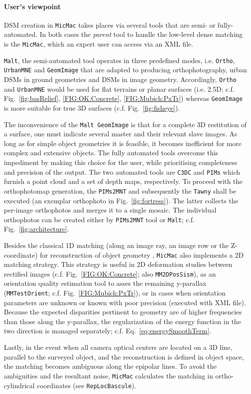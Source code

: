 \documentclass[twocolumn]{bmcart}%
\begin{document}
\paragraph*{User's viewpoint}
DSM creation in {\tt MicMac} takes places via several tools that are semi- or fully-automated. In both cases the \textit{parent} tool to handle the low-level dense matching is the {\tt MicMac}, which an expert user can access via an XML file.\par 
%
{\tt Malt}, the semi-automated tool operates in three predefined modes, i.e. {\tt Ortho}, {\tt UrbanMNE} and {\tt GeomImage} that are adapted to producing orthophotography, urban DSMs in ground geometries and DSMs in image geometry. Accordingly, {\tt Ortho} and {\tt UrbanMNE} would be used for flat terrains or planar surfaces (i.e. 2.5D; c.f. Fig.~\ref{fig:basRelief}, \ref{FIG:OK:Concrete}, \ref{FIG:Mubich:PxTr}) whereas {\tt GeomImage} is more suitable for true 3D surfaces (c.f. Fig.~\ref{fig:fisheye}).\par 
%
The inconvenience of the {\tt Malt GeomImage} is that for a complete 3D restitution of a surface, one must indicate several master and their relevant slave images. As long as for simple object geometries it is feasible, it becomes inefficient for more complex and extensive objects. The fully automated tools overcome this impediment by making this choice for the user, while prioritising completeness and precision of the output. The two automated tools are {\tt C3DC} and {\tt PIMs} which furnish a point cloud and a set of depth maps, respectively. To proceed with the orthophotomap generation, the {\tt PIMs2MNT} and subsequently the {\tt Tawny} shall be executed (an exemplar orthophoto in Fig.~\ref{fig:fortress}). The latter collects the per-image orthophotos and merges it to a single mosaic. The individual orthophotos can be created either by {\tt PIMs2MNT} tool or {\tt Malt}; c.f. Fig.~\ref{fig:architecture}.\par 
%
Besides the classical 1D matching (along an image ray, an image row or the Z-coordinate) for reconstruction of object geometry , {\tt MicMac} also implements a 2D matching strategy. This strategy is useful in 2D deformation studies between rectified images (c.f. Fig.~\ref{FIG:OK:Concrete}; also {\tt MM2DPosSism}), as an orientation quality estimation tool to asses the remaining y-parallax ({\tt MMTestOrient}; c.f. Fig.~\ref{FIG:Mubich:PxTr}), or in cases when orientation parameters are unknown or known with poor precision (executed with XML file). Because the expected disparities pertinent to geometry are of higher frequencies than those along the y-parallax, the regularization of the energy function in the two direction is managed separately; c.f. Eq.~\eqref{eq:energySmoothTerm}.\par 
%
Lastly, in the event when all camera optical centers are located on a 3D line, parallel to the surveyed object, and the reconstruction is defined in object space, the matching becomes ambiguous along the epipolar lines. To avoid the ambiguities and the resultant noise, {\tt MicMac} calculates the matching in ortho-cylindrical coordinates (see {\tt RepLocBascule}). 
\end{document}
